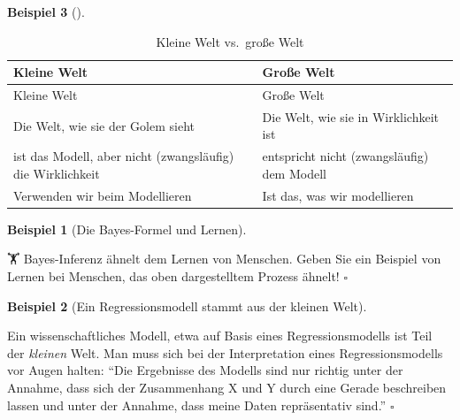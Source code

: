 \documentclass[
  ngerman,
  letterpaper,
  twoside,
  open=any]{scrbook}
\theoremstyle{definition}
\newtheorem{example}{Beispiel}[chapter]
\theoremstyle{plain}
\theoremstyle{definition}
\theoremstyle{definition}
\theoremstyle{remark}
\begin{document}
\begin{example}[]
\begin{longtable}[]{@{}
  >{\raggedright\arraybackslash}p{}
  >{\raggedright\arraybackslash}p{}@{}}
\caption{Kleine Welt vs.~große
Welt}\label{tbl-klein-gross}\tabularnewline
\toprule\noalign{}
\begin{minipage}[b]{\linewidth}\raggedright
Kleine Welt
\end{minipage} & \begin{minipage}[b]{\linewidth}\raggedright
Große Welt
\end{minipage} \\
\midrule\noalign{}
\endfirsthead
\toprule\noalign{}
\begin{minipage}[b]{\linewidth}\raggedright
Kleine Welt
\end{minipage} & \begin{minipage}[b]{\linewidth}\raggedright
Große Welt
\end{minipage} \\
\midrule\noalign{}
\endhead
\bottomrule\noalign{}
\endlastfoot
Die Welt, wie sie der Golem sieht & Die Welt, wie sie in Wirklichkeit
ist \\
ist das Modell, aber nicht (zwangsläufig) die Wirklichkeit & entspricht
nicht (zwangsläufig) dem Modell \\
Verwenden wir beim Modellieren & Ist das, was wir modellieren \\
\end{longtable}

\begin{example}[Die Bayes-Formel und
Lernen]\protect\hypertarget{exm-bayes-lernen}{}\label{exm-bayes-lernen}

🏋 Bayes-Inferenz ähnelt dem Lernen von Menschen. Geben Sie ein Beispiel
von Lernen bei Menschen, das oben dargestelltem Prozess ähnelt!
\(\square\)

\end{example}

\begin{example}[Ein Regressionsmodell stammt aus der kleinen
Welt]\protect\hypertarget{exm-regr-grosse-welt}{}\label{exm-regr-grosse-welt}

Ein wissenschaftliches Modell, etwa auf Basis eines Regressionsmodells
ist Teil der \emph{kleinen} Welt. Man muss sich bei der Interpretation
eines Regressionsmodells vor Augen halten: \enquote{Die Ergebnisse des
Modells sind nur richtig unter der Annahme, dass sich der Zusammenhang X
und Y durch eine Gerade beschreiben lassen und unter der Annahme, dass
meine Daten repräsentativ sind.} \(\square\)


\end{example}
\end{example}
\end{document}
